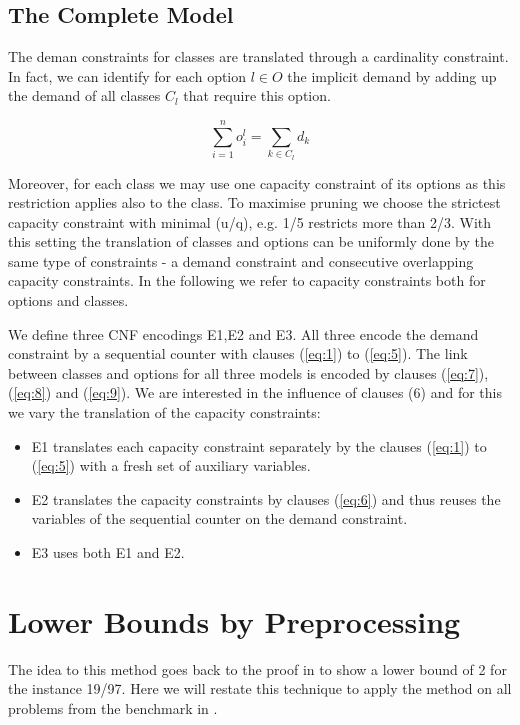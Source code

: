 \documentclass[]{llncs}
\begin{document}
\subsection{The Complete Model}
\label{sub:complete}


The deman constraints for classes are translated through a cardinality constraint.  In fact, we can identify for each
option $l \in O$ the implicit demand by adding up the demand of all classes $C_l$ that require this option.

$$ \sum_{i=1}^n o^l_i = \sum_{k\in C_l} d_k$$                                                 

Moreover, for each class we may use one capacity constraint of its options as this restriction applies also to the
class. To maximise pruning we choose the strictest capacity constraint with minimal (u/q), e.g. 1/5 restricts more than
2/3. With this setting the translation of classes and options can be uniformly done by the same type of constraints - a
demand constraint and consecutive overlapping capacity constraints. In the following we refer to capacity constraints
both for options and classes. 
 
We define three CNF encodings E1,E2 and E3. All three encode the demand constraint by a sequential counter with clauses
(\ref{eq:1}) to (\ref{eq:5}).  The link between classes and options for all three models is encoded by clauses
(\ref{eq:7}),(\ref{eq:8}) and (\ref{eq:9}). We are interested in the influence of clauses (6) and for this we vary the
translation of the capacity constraints: 

\begin{itemize}
    \item E1 translates each capacity constraint separately by the clauses (\ref{eq:1}) to (\ref{eq:5}) with a fresh set
        of auxiliary variables. 
    \item E2 translates the capacity constraints by clauses (\ref{eq:6}) and thus reuses the variables of the
        sequential counter on the demand constraint. 
    \item E3 uses both E1 and E2. 
\end{itemize}



\section{Lower Bounds by Preprocessing}
\label{sec:lower}

The idea to this method goes back to the proof in \cite{Gent98} to show a lower bound of 2 for the instance 19/97. Here
we will restate this technique to apply the method on all problems from the benchmark in \cite{Gravel05}. 
\end{document}
